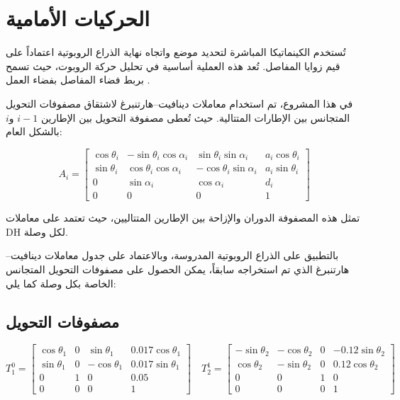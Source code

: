 \section{الحركيات الأمامية}

تُستخدم الكينماتيكا المباشرة  لتحديد موضع واتجاه نهاية الذراع الروبوتية  اعتماداً على قيم زوايا المفاصل. تُعد هذه العملية أساسية في تحليل حركة الروبوت، حيث تسمح بربط فضاء المفاصل  بفضاء العمل .

في هذا المشروع، تم استخدام معاملات دينافيت–هارتنبرغ  لاشتقاق مصفوفات التحويل المتجانس بين الإطارات المتتالية. حيث تُعطى مصفوفة التحويل بين الإطارين \(i-1\) و\(i\) بالشكل العام:

\[
A_i =
\begin{bmatrix}
\cos\theta_i & -\sin\theta_i \cos\alpha_i & \sin\theta_i \sin\alpha_i & a_i \cos\theta_i \\
\sin\theta_i & \cos\theta_i \cos\alpha_i  & -\cos\theta_i \sin\alpha_i & a_i \sin\theta_i \\
0            & \sin\alpha_i              & \cos\alpha_i               & d_i \\
0            & 0                         & 0                          & 1
\end{bmatrix}
\]

تمثل هذه المصفوفة الدوران والإزاحة بين الإطارين المتتاليين، حيث تعتمد على معاملات DH لكل وصلة.

بالتطبيق على الذراع الروبوتية المدروسة، وبالاعتماد على جدول معاملات دينافيت–هارتنبرغ الذي تم استخراجه سابقاً، يمكن الحصول على مصفوفات التحويل المتجانس الخاصة بكل وصلة كما يلي:

\subsection{مصفوفات التحويل}


\[
T_1^0 =
\begin{bmatrix}
\cos\theta_{1} & 0 & \sin\theta_{1}  & 0.017\cos\theta_{1} \\
\sin\theta_{1} & 0 & -\cos\theta_{1} & 0.017\sin\theta_{1} \\
0              & 1 &               0 & 0.05 \\
0              & 0 &               0 & 1
\end{bmatrix}
\quad 
T_2^1 =
\begin{bmatrix}
-\sin\theta_2 & -\cos\theta_2 & 0 & -0.12\sin\theta_2 \\
\cos\theta_2 & -\sin\theta_2 & 0 & 0.12\cos\theta_2 \\
0 & 0 & 1 & 0 \\
0 & 0 & 0 & 1
\end{bmatrix}
\]



